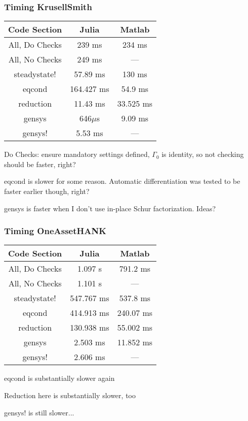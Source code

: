 \documentclass{beamer}
\begin{document}
\begin{frame}
  \frametitle{Timing KrusellSmith}
  \begin{center}
    \begin{tabular}{|c|c|c|}
      \hline
      Code Section & Julia & Matlab\\
      \hline
      All, Do Checks & 239 ms & 234 ms\\
      All, No Checks & 249 ms & ---\\
      steadystate! & 57.89 ms & 130 ms\\
      eqcond & 164.427 ms & 54.9 ms\\
      reduction & 11.43 ms & 33.525 ms\\
      gensys & 646$\mu$s & 9.09 ms\\
      gensys! & 5.53 ms & ---
    \end{tabular}
\item Do Checks: ensure mandatory settings defined, $\Gamma_0$ is identity, so not checking should be faster, right?
\item eqcond is slower for some reason. Automatic differentiation was tested to be faster earlier though, right?
\item gensys is faster when I don't use in-place Schur factorization. Ideas?
  \end{center}
\end{frame}
\begin{frame}
  \frametitle{Timing OneAssetHANK}
  \begin{center}
    \begin{tabular}{|c|c|c|}
      \hline
      Code Section & Julia & Matlab\\
      \hline
      All, Do Checks & 1.097 s & 791.2 ms\\
      All, No Checks & 1.101 s & ---\\
      steadystate! & 547.767 ms & 537.8 ms\\
      eqcond & 414.913  ms & 240.07 ms\\
      reduction & 130.938 ms & 55.002 ms\\
      gensys & 2.503 ms & 11.852 ms\\
      gensys! & 2.606 ms & ---
    \end{tabular}
\item eqcond is substantially slower again
\item Reduction here is substantially slower, too
\item gensys! is still slower...
  \end{center}
\end{frame}
\end{document}
